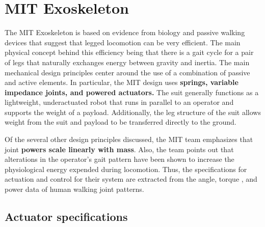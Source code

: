 



% 
\section{MIT Exoskeleton}

The MIT Exoskeleton is based on evidence from biology and passive walking devices that suggest that legged locomotion can be very efficient.  The main physical concept behind this efficiency being that there is a gait cycle for a pair of legs that naturally exchanges energy between gravity and inertia.  The main mechanical design principles center around the use of a combination of passive and active elements.  In particular, the MIT design uses {\bf springs, variable impedance joints, and powered actuators.}  The suit generally  functions as a lightweight, underactuated robot that runs in parallel to an operator and supports the weight of a payload. Additionally, the leg structure of the suit allows weight from the suit and payload to be transferred directly to the ground.

Of the several other design principles discussed, the MIT team emphasizes that joint {\bf powers scale linearly with mass}.  Also, the team points out that alterations in the operator's gait pattern have been shown to increase the physiological energy expended during locomotion.  Thus, the specifications for actuation and control for their system are extracted from the angle, torque , and power data of human walking joint patterns.      

\subsection{Actuator specifications}


